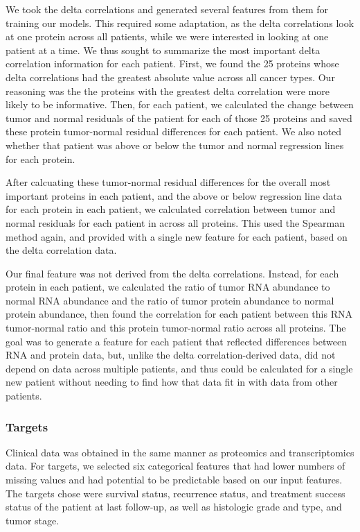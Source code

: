 \documentclass{article}
\begin{document}
We took the delta correlations and generated several features from them for training our models. This required some adaptation, as the delta correlations look at one protein across all patients, while we were interested in looking at one patient at a time. We thus sought to summarize the most important delta correlation information for each patient. First, we found the 25 proteins whose delta correlations had the greatest absolute value across all cancer types. Our reasoning was the the proteins with the greatest delta correlation were more likely to be informative. Then, for each patient, we calculated the change between tumor and normal residuals of the patient for each of those 25 proteins and saved these protein tumor-normal residual differences for each patient. We also noted whether that patient was above or below the tumor and normal regression lines for each protein.

After calcuating these tumor-normal residual differences for the overall most important proteins in each patient, and the above or below regression line data for each protein in each patient, we calculated correlation between tumor and normal residuals for each patient in across all proteins. This used the Spearman method again, and provided with a single new feature for each patient, based on the delta correlation data.

Our final feature was not derived from the delta correlations. Instead, for each protein in each patient, we calculated the ratio of tumor RNA abundance to normal RNA abundance and the ratio of tumor protein abundance to normal protein abundance, then found the correlation for each patient between this RNA tumor-normal ratio and this protein tumor-normal ratio across all proteins. The goal was to generate a feature for each patient that reflected differences between RNA and protein data, but, unlike the delta correlation-derived data, did not depend on data across multiple patients, and thus could be calculated for a single new patient without needing to find how that data fit in with data from other patients.

\subsubsection{Targets}

Clinical data was obtained in the same manner as proteomics and transcriptomics data. For targets, we selected six categorical features that had lower numbers of missing values and had potential to be predictable based on our input features. The targets chose were survival status, recurrence status, and treatment success status of the patient at last follow-up, as well as histologic grade and type, and tumor stage.
\end{document}
